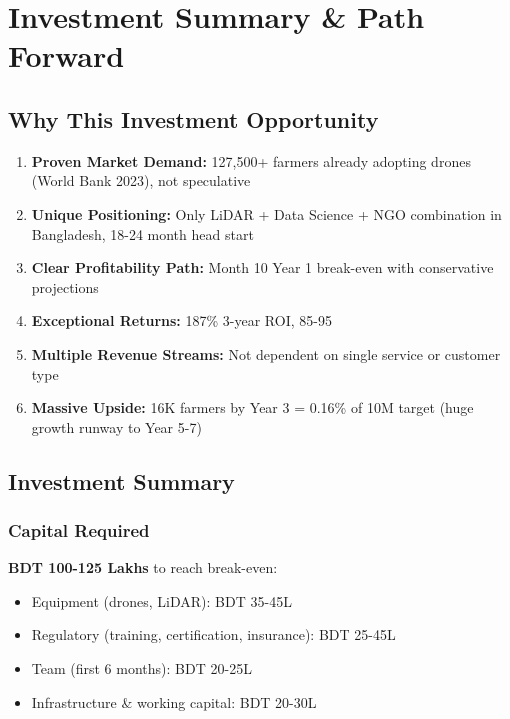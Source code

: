 
\chapter{Investment Summary \& Path Forward}

\section{Why This Investment Opportunity}

\begin{enumerate}
    \item \textbf{Proven Market Demand:} 127,500+ farmers already adopting drones (World Bank 2023), not speculative
    \item \textbf{Unique Positioning:} Only LiDAR + Data Science + NGO combination in Bangladesh, 18-24 month head start
    \item \textbf{Clear Profitability Path:} Month 10 Year 1 break-even with conservative projections
    \item \textbf{Exceptional Returns:} 187\% 3-year ROI, 85-95%
    \item \textbf{Multiple Revenue Streams:} Not dependent on single service or customer type
    \item \textbf{Massive Upside:} 16K farmers by Year 3 = 0.16\% of 10M target (huge growth runway to Year 5-7)
\end{enumerate}

\section{Investment Summary}

\subsection{Capital Required}

\textbf{BDT 100-125 Lakhs} to reach break-even:
\begin{itemize}
    \item Equipment (drones, LiDAR): BDT 35-45L
    \item Regulatory (training, certification, insurance): BDT 25-45L
    \item Team (first 6 months): BDT 20-25L
    \item Infrastructure \& working capital: BDT 20-30L
\end{itemize}

